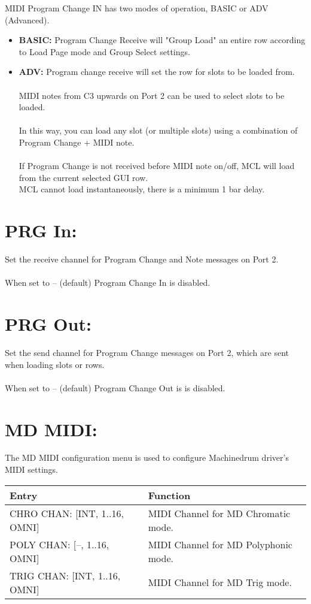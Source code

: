 MIDI Program Change IN has two modes of operation, BASIC or ADV (Advanced).
\begin{itemize}
    \item{ \textbf{BASIC:} Program Change Receive will "Group Load" an entire row according to Load Page mode and Group Select settings. }
    \item{  \textbf{ADV:} Program change receive will set the row for slots to be loaded from.\\\\ MIDI notes from C3 upwards on Port 2 can be used to select slots to be loaded.\\\\  In this way, you can load any slot (or multiple slots) using a combination of Program Change + MIDI note. \\\\
 If Program Change is not received before MIDI note on/off, MCL will load from the current selected GUI row. }
 \\
 MCL cannot load instantaneously, there is a minimum 1 bar delay.
\end{itemize}
\section{PRG In:}
Set the receive channel for Program Change and Note messages on Port 2.\\\\
When set to -- (default) Program Change In is disabled.
\section{PRG Out:}
Set the send channel for Program Change messages on Port 2, which are sent when loading slots or rows.\\\\
When set to -- (default) Program Change Out is is disabled.

\newpage

\section{MD MIDI:}
The MD MIDI configuration menu is used to configure Machinedrum driver's MIDI settings.
\\
\begin{tabular}{|l|l|}
\hline
\rowcolor[HTML]{C0C0C0} 
Entry                                  & Function                                                                       \\ \hline
CHRO CHAN: {[}INT, 1..16, OMNI{]}        & MIDI Channel for MD Chromatic mode. \\ \hline
POLY CHAN: {[}--, 1..16, OMNI{]}         & MIDI Channel for MD Polyphonic mode. \\ \hline
TRIG CHAN: {[}INT, 1..16, OMNI{]}        & MIDI Channel for MD Trig mode. \\ \hline
\end{tabular}

